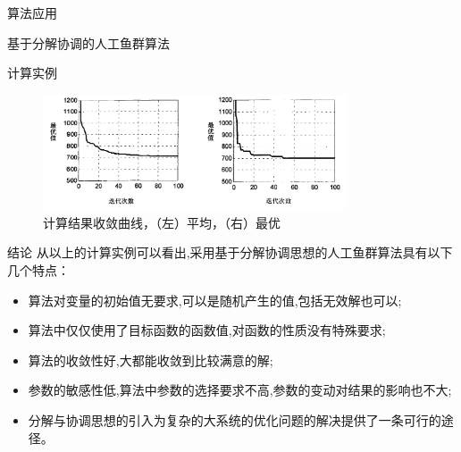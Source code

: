 \documentclass[UTF8]{ctexart}
\begin{document}
\begin{section}{算法应用}
\begin{subsection}{基于分解协调的人工鱼群算法}
\begin{subsubsection}{计算实例}
\begin{figure}[H]
\centering
\includegraphics[width=0.8\textwidth]{../../pic/fish16.png}
\caption{计算结果收敛曲线，（左）平均，（右）最优}
\end{figure}

\end{subsubsection}
\begin{subsubsection}{结论}
从以上的计算实例可以看出,采用基于分解协调思想的人工鱼群算法具有以下几个特点：
\begin{itemize}
\item 算法对变量的初始值无要求,可以是随机产生的值,包括无效解也可以;
\item 算法中仅仅使用了目标函数的函数值,对函数的性质没有特殊要求;
\item 算法的收敛性好,大都能收敛到比较满意的解;
\item 参数的敏感性低,算法中参数的选择要求不高,参数的变动对结果的影响也不大;
\item 分解与协调思想的引入为复杂的大系统的优化问题的解决提供了一条可行的途径。
\end{itemize}
\end{subsubsection}

\end{subsection}
\end{section}
\end{document}
